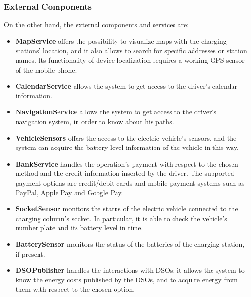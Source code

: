 \documentclass[../main.tex]{subfiles}
\begin{document}
\subsubsection{External Components}
On the other hand, the external components and services are:
\begin{itemize}
    \item \textbf{MapService} offers the possibility to visualize maps with the charging stations' location, and it also allows to search for specific addresses or station names. Its functionality of device localization requires a working GPS sensor of the mobile phone.
    \item \textbf{CalendarService} allows the system to get access to the driver's calendar information. 
    \item \textbf{NavigationService} allows the system to get access to the driver's navigation system, in order to know about his paths.
    \item \textbf{VehicleSensors} offers the access to the electric vehicle's sensors, and the system can acquire the battery level information of the vehicle in this way. 
    \item \textbf{BankService} handles the operation's payment with respect to the chosen method and the credit information inserted by the driver. The supported payment options are credit/debit cards and mobile payment systems such as PayPal, Apple Pay and Google Pay. 
    \item \textbf{SocketSensor} monitors the status of the electric vehicle connected to the charging column's socket. In particular, it is able to check the vehicle's number plate and its battery level in time.
    \item \textbf{BatterySensor} monitors the status of the batteries of the charging station, if present. 
    \item \textbf{DSOPublisher} handles the interactions with DSOs: it allows the system to know the energy costs published by the DSOs, and to acquire energy from them with respect to the chosen option.
\end{itemize}

\newpage
\end{document}
